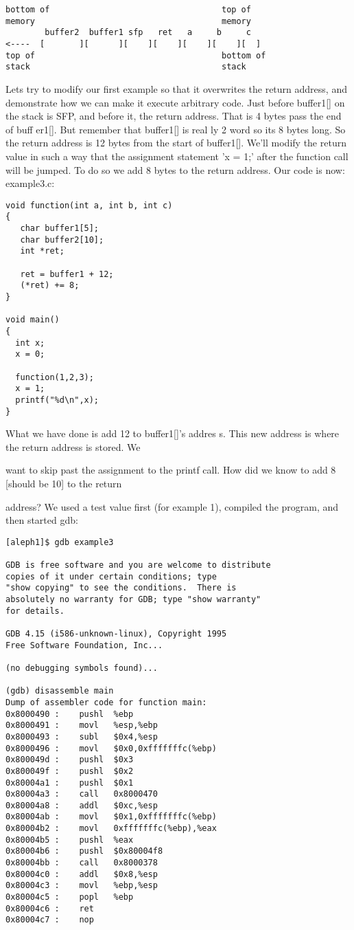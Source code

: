 \documentclass[10pt]{article}
\begin{document}
\begin{CJK}{UTF8}{bsmi}
{\small
\begin{verbatim}
bottom of                                   top of
memory                                      memory
        buffer2  buffer1 sfp   ret   a     b     c
<----  [       ][      ][    ][    ][    ][    ][  ]
top of                                      bottom of
stack                                       stack
\end{verbatim}
}
Lets try to modify our first example so that it overwrites the return address, and demonstrate how we can make 
it execute arbitrary code. Just before buffer1[] on the stack is SFP, and before it, the return address. That is 4 
bytes pass the end of buff er1[]. But remember that buffer1[] is real ly 2 word so its 8 bytes long. So the return 
address is 12 bytes from the start of buffer1[]. We'll modify the return value in such a way that the assignment 
statement 'x = 1;' after the function call will be jumped. To do so we add 8 bytes to the return address. 
Our code is now: example3.c:

\begin{lstlisting}
void function(int a, int b, int c) 
{
   char buffer1[5];
   char buffer2[10];
   int *ret;

   ret = buffer1 + 12;
   (*ret) += 8;
}

void main() 
{
  int x;
  x = 0;

  function(1,2,3);
  x = 1;
  printf("%d\n",x);
}
\end{lstlisting}

What we have done is add 12 to buffer1[]'s addres s. This new address is where the return address is stored. We 

want to skip past the assignment to the printf call. How did we know to add 8 [should be 10] to the return 

address? We used a test value first (for example 1), compiled the program, and  then started gdb:

{\small
\begin{verbatim}
[aleph1]$ gdb example3

GDB is free software and you are welcome to distribute 
copies of it under certain conditions; type 
"show copying" to see the conditions.  There is 
absolutely no warranty for GDB; type "show warranty" 
for details.

GDB 4.15 (i586-unknown-linux), Copyright 1995 
Free Software Foundation, Inc...

(no debugging symbols found)...

(gdb) disassemble main
Dump of assembler code for function main:
0x8000490 :    pushl  %ebp
0x8000491 :    movl   %esp,%ebp
0x8000493 :    subl   $0x4,%esp
0x8000496 :    movl   $0x0,0xfffffffc(%ebp)
0x800049d :    pushl  $0x3
0x800049f :    pushl  $0x2
0x80004a1 :    pushl  $0x1
0x80004a3 :    call   0x8000470 
0x80004a8 :    addl   $0xc,%esp
0x80004ab :    movl   $0x1,0xfffffffc(%ebp)
0x80004b2 :    movl   0xfffffffc(%ebp),%eax
0x80004b5 :    pushl  %eax
0x80004b6 :    pushl  $0x80004f8
0x80004bb :    call   0x8000378 
0x80004c0 :    addl   $0x8,%esp
0x80004c3 :    movl   %ebp,%esp
0x80004c5 :    popl   %ebp
0x80004c6 :    ret
0x80004c7 :    nop
\end{verbatim}
}


\end{CJK}
\end{document}
